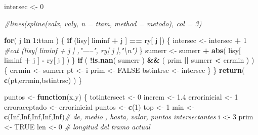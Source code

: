 \documentclass[]{article}
\newenvironment{Shaded}{\begin{snugshade}}{\end{snugshade}}
\newcommand{\KeywordTok}[1]{\textcolor[rgb]{0.13,0.29,0.53}{\textbf{#1}}}
\newcommand{\DecValTok}[1]{\textcolor[rgb]{0.00,0.00,0.81}{#1}}
\newcommand{\FloatTok}[1]{\textcolor[rgb]{0.00,0.00,0.81}{#1}}
\newcommand{\StringTok}[1]{\textcolor[rgb]{0.31,0.60,0.02}{#1}}
\newcommand{\CommentTok}[1]{\textcolor[rgb]{0.56,0.35,0.01}{\textit{#1}}}
\newcommand{\OtherTok}[1]{\textcolor[rgb]{0.56,0.35,0.01}{#1}}
\newcommand{\ControlFlowTok}[1]{\textcolor[rgb]{0.13,0.29,0.53}{\textbf{#1}}}
\newcommand{\OperatorTok}[1]{\textcolor[rgb]{0.81,0.36,0.00}{\textbf{#1}}}
\newcommand{\NormalTok}[1]{#1}
\begin{document}
\begin{Shaded}
\begin{Highlighting}[]
\NormalTok{    intersec <-}\StringTok{ }\DecValTok{0}
    
    \CommentTok{#lines(spline(valx, valy, n = ttam, method = metodo), col = 3)}
    
    \ControlFlowTok{for}\NormalTok{( j }\ControlFlowTok{in} \DecValTok{1}\OperatorTok{:}\NormalTok{ttam )}
\NormalTok{    \{}
      \ControlFlowTok{if}\NormalTok{ (lisy[ liminf }\OperatorTok{+}\StringTok{ }\NormalTok{j ] }\OperatorTok{==}\StringTok{  }\NormalTok{ry[ j ])}
\NormalTok{      \{}
\NormalTok{        intersec <-}\StringTok{ }\NormalTok{intersec }\OperatorTok{+}\StringTok{ }\DecValTok{1}
        \CommentTok{#cat (lisy[ liminf + j ]  ,"-----",  ry[ j ],"\textbackslash{}n")}
\NormalTok{      \}}
\NormalTok{      sumerr <-}\StringTok{ }\NormalTok{sumerr }\OperatorTok{+}\StringTok{ }\KeywordTok{abs}\NormalTok{( lisy[ liminf }\OperatorTok{+}\StringTok{ }\NormalTok{j ] }\OperatorTok{-}\StringTok{  }\NormalTok{ry[ j ] ) }
\NormalTok{    \}}
    \ControlFlowTok{if}\NormalTok{ ( }\OperatorTok{!}\KeywordTok{is.nan}\NormalTok{( sumerr ) }\OperatorTok{&&}\StringTok{ }\NormalTok{( prim }\OperatorTok{||}\StringTok{ }\NormalTok{sumerr }\OperatorTok{<}\StringTok{ }\NormalTok{errmin ) )}
\NormalTok{    \{}
\NormalTok{      errmin <-}\StringTok{ }\NormalTok{sumerr}
\NormalTok{      pt     <-}\StringTok{ }\NormalTok{i }
\NormalTok{      prim   <-}\StringTok{ }\OtherTok{FALSE}
\NormalTok{      bstintrsc <-}\StringTok{ }\NormalTok{intersec}
\NormalTok{    \}}
\NormalTok{  \}}
  \KeywordTok{return}\NormalTok{( }\KeywordTok{c}\NormalTok{(pt,errmin,bstintrsc) )}
\NormalTok{\}}

\NormalTok{puntos <-}\StringTok{ }\ControlFlowTok{function}\NormalTok{(x,y)}
\NormalTok{\{}
\NormalTok{  totintersect <-}\StringTok{ }\DecValTok{0}
\NormalTok{  increm <-}\StringTok{ }\FloatTok{1.4}
\NormalTok{  errorinicial  <-}\StringTok{ }\DecValTok{1}
\NormalTok{  erroraceptado <-}\StringTok{ }\NormalTok{errorinicial}
\NormalTok{  puntos <-}\StringTok{ }\KeywordTok{c}\NormalTok{(}\DecValTok{1}\NormalTok{)}
\NormalTok{  top    <-}\StringTok{ }\DecValTok{1} 
\NormalTok{  min    <-}\StringTok{ }\KeywordTok{c}\NormalTok{(}\OtherTok{Inf}\NormalTok{,}\OtherTok{Inf}\NormalTok{,}\OtherTok{Inf}\NormalTok{,}\OtherTok{Inf}\NormalTok{,}\OtherTok{Inf}\NormalTok{)}\CommentTok{# de, medio , hasta, valor, puntos intersectantes }
\NormalTok{  i      <-}\StringTok{ }\DecValTok{3}
\NormalTok{  prim   <-}\StringTok{ }\OtherTok{TRUE}
\NormalTok{  len    <-}\StringTok{ }\DecValTok{0} \CommentTok{# longitud del tramo actual }
  

\end{Highlighting}
\end{Shaded}
\end{document}
